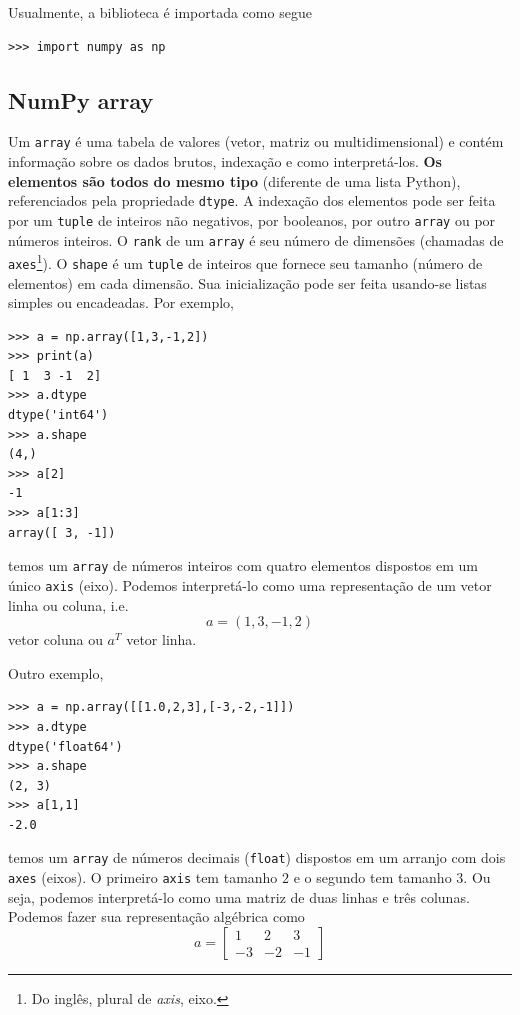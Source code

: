 \documentclass[12pt]{article}
\begin{document}
Usualmente, a biblioteca é importada como segue
\begin{lstlisting}
>>> import numpy as np
\end{lstlisting}

\subsection{NumPy array}

Um \lstinline+array+ é uma tabela de valores (vetor, matriz ou multidimensional) e contém informação sobre os dados brutos, indexação e como interpretá-los. {\bf Os elementos são todos do mesmo tipo} (diferente de uma lista Python), referenciados pela propriedade \lstinline+dtype+. A indexação dos elementos pode ser feita por um \lstinline+tuple+ de inteiros não negativos, por booleanos, por outro \lstinline+array+ ou por números inteiros. O \lstinline+rank+ de um \lstinline+array+ é seu número de dimensões (chamadas de \lstinline+axes+\footnote{Do inglês, plural de {\it axis}, eixo.}). O \lstinline+shape+ é um \lstinline+tuple+ de inteiros que fornece seu tamanho (número de elementos) em cada dimensão. Sua inicialização pode ser feita usando-se listas simples ou encadeadas. Por exemplo,
\begin{lstlisting}
>>> a = np.array([1,3,-1,2])
>>> print(a)
[ 1  3 -1  2]
>>> a.dtype
dtype('int64')
>>> a.shape
(4,)
>>> a[2]
-1
>>> a[1:3]
array([ 3, -1])
\end{lstlisting}
temos um \lstinline+array+ de números inteiros com quatro elementos dispostos em um único \lstinline+axis+ (eixo). Podemos interpretá-lo como uma representação de um vetor linha ou coluna, i.e.
\begin{equation}
  a = (1, 3, -1, 2)
\end{equation}
vetor coluna ou $a^T$ vetor linha.

Outro exemplo,
\begin{lstlisting}
>>> a = np.array([[1.0,2,3],[-3,-2,-1]])
>>> a.dtype
dtype('float64')
>>> a.shape
(2, 3)
>>> a[1,1]
-2.0
\end{lstlisting}
temos um \lstinline+array+ de números decimais (\lstinline+float+) dispostos em um arranjo com dois \lstinline+axes+ (eixos). O primeiro \lstinline+axis+ tem tamanho $2$ e o segundo tem tamanho $3$. Ou seja, podemos interpretá-lo como uma matriz de duas linhas e três colunas. Podemos fazer sua representação algébrica como
\begin{equation}
  a =
  \begin{bmatrix}
    1 & 2 & 3\\
    -3 & -2 & -1 
  \end{bmatrix}
\end{equation}
\end{document}
